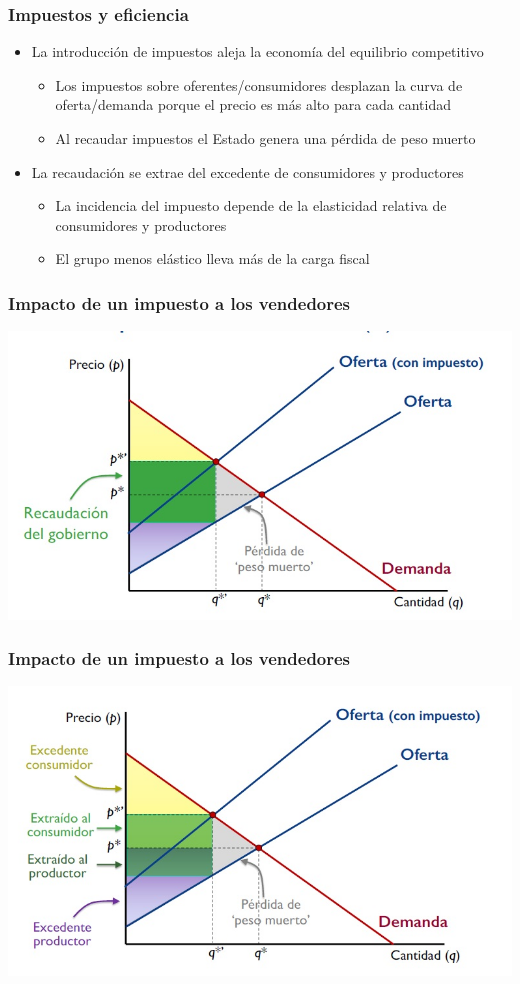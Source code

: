 \documentclass{beamer}
\begin{document}
\begin{frame}
\frametitle{Impuestos y eficiencia}
\begin{itemize}
    \item La introducción de impuestos aleja la economía del equilibrio competitivo
    \begin{itemize}
        \item Los impuestos sobre oferentes/consumidores desplazan la curva de oferta/demanda porque el precio es más alto para cada cantidad
        \item Al recaudar impuestos el Estado genera una pérdida de peso muerto
    \end{itemize}
    \item La recaudación se extrae del excedente de consumidores y productores
    \begin{itemize}
        \item La incidencia del impuesto depende de la elasticidad relativa de consumidores y productores
        \item El grupo menos elástico lleva más de la carga fiscal
    \end{itemize}
\end{itemize}
\end{frame}

\begin{frame}
\frametitle{Impacto de un impuesto a los vendedores}
\includegraphics[scale=0.6]{../Figures/Tema_07.29_impuesto1.jpg}
\end{frame}

\begin{frame}
\frametitle{Impacto de un impuesto a los vendedores}
\includegraphics[scale=0.6]{../Figures/Tema_07.30_impuesto2.jpg}
\end{frame}
\end{document}
